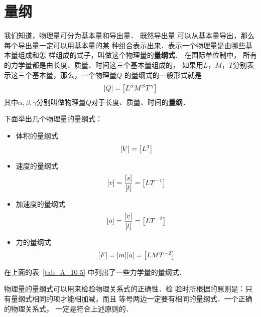 




\chapter{量纲}

我们知道，物理量可分为基本量和导出量．
既然导出量
可以从基本量导出，那么每个导出量一定可以用基本量的某
种组合表示出来．表示一个物理量是由哪些基本量组成和怎
样组成的式子，叫做这个物理量的\textbf{量纲式}．
在国际单位制中，
所有的力学量都是由长度、质量、时间这三个基本量组成的，
如果用$L $，$ M $，$ T$分别表示这三个基本量，那么，一个物理量$Q$
的量纲式的一般形式就是
\[[Q]=\qty[L^{\alpha}M^{\beta}T^{\gamma}]\]
其中$\alpha, \beta, \gamma$分别叫做物理量$Q$对于长度、质量、时间的\textbf{量纲}．

下面举出几个物理量的量纲式：
\begin{itemize}
    \item 体积的量纲式
    \[[V]=\qty[L^3]  \]
    \item 速度的量纲式
    \[[v]=\frac{[s]}{[t]}=\qty[LT^{-1}]  \] 
    \item 加速度的量纲式
    \[ [a]=\frac{[v]}{[t]}=\qty[LT^{-2}] \]
    \item 力的量纲式
    \[ [F]=[m][a]=\qty[LMT^{-2}] \]
\end{itemize}

在上面的表~\ref{tab_A_10-5} 中列出了一些力学量的量纲式．

物理量的量纲式可以用来检验物理关系式的正确性．检
验时所根据的原则是：只有量纲式相同的项才能相加减，而且
等号两边一定要有相同的量纲式．一个正确的物理关系式，
一定是符合上述原则的．







